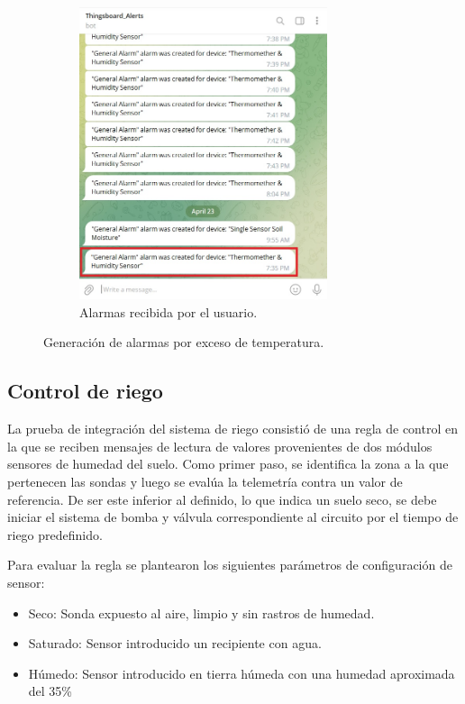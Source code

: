 \begin{figure}[!h]
\begin{subfigure}[b]{0.45\textwidth}
		\includegraphics[width=0.80\textwidth]{./Figures/chapter4/temp_user_alarm.jpg}
		\caption{Alarmas recibida por el usuario.}
		\label{fig:temp_alarm_user}
     \end{subfigure}
     \hfill
        \caption[Generación de alarmas por exceso de temperatura]{Generación de alarmas por exceso de temperatura.}
        \label{fig:tb_clima_automation}
\end{figure}


\pagebreak
\subsection{Control de riego}
\label{sec:Control de riego}

La prueba de integración del sistema de riego consistió de una regla de control en la que se reciben mensajes de lectura de valores provenientes de dos módulos sensores de humedad del suelo. Como primer paso, se identifica la zona a la que pertenecen las sondas y luego se evalúa la telemetría contra un valor de referencia. De ser este inferior al definido, lo que indica un suelo seco, se debe iniciar el sistema de bomba y válvula correspondiente al circuito por el tiempo de riego predefinido. 

Para evaluar la regla se plantearon los siguientes parámetros de configuración de sensor:
\begin{itemize}
\item Seco: Sonda expuesto al aire, limpio y sin rastros de humedad.
\item Saturado: Sensor introducido un recipiente con agua.
\item Húmedo: Sensor introducido en tierra húmeda con una humedad aproximada del 35\%
\end{itemize}

